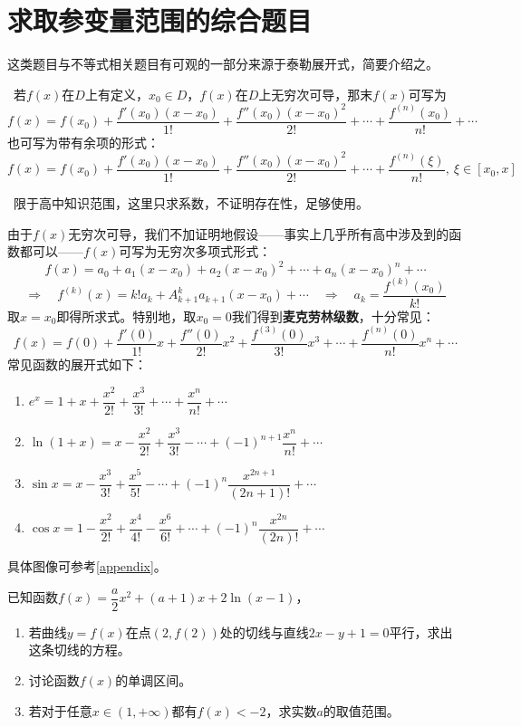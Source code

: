 \section{求取参变量范围的综合题目}
这类题目与不等式相关题目有可观的一部分来源于泰勒展开式，简要介绍之。
\begin{thm}
	\ 若$f(x)$在$D$上有定义，$x_0\in D$，$f(x)$在$D$上无穷次可导，那末$f(x)$可写为
	$$f(x)=f(x_0)+\dfrac{f'(x_0)(x-x_0)}{1!}+\dfrac{f''(x_0)(x-x_0)^2}{2!}+\cdots+\dfrac{f^{(n)}(x_0)}{n!}+\cdots$$也可写为带有余项的形式：$$f(x)=f(x_0)+\dfrac{f'(x_0)(x-x_0)}{1!}+\dfrac{f''(x_0)(x-x_0)^2}{2!}+\cdots+\dfrac{f^{(n)}(\xi)}{n!},\ \xi\in[x_0,x]$$
\end{thm}
\begin{kaiti}
	\ 限于高中知识范围，这里只求系数，不证明存在性，足够使用。\par
	由于$f(x)$无穷次可导，我们不加证明地假设——事实上几乎所有高中涉及到的函数都可以——$f(x)$可写为无穷次多项式形式：$$f(x)=a_0+a_1(x-x_0)+a_2(x-x_0)^2+\cdots+a_n(x-x_0)^n+\cdots$$$$\Rightarrow\quad f^{(k)}(x)=k!a_k+A_{k+1}^ka_{k+1}(x-x_0)+\cdots\quad\Rightarrow\quad a_k=\dfrac{f^{(k)}(x_0)}{k!}$$取$x=x_0$即得所求式。特别地，取$x_0=0$我们得到\textbf{麦克劳林级数}，十分常见：
	$$f(x)=f(0)+\dfrac{f'(0)}{1!}x+\dfrac{f''(0)}{2!}x^2+\dfrac{f^{(3)}(0)}{3!}x^3+\cdots+\dfrac{f^{(n)}(0)}{n!}x^n+\cdots$$
	常见函数的展开式如下：\begin{enumerate}
		\item $\displaystyle e^x=1+x+\dfrac{x^2}{2!}+\dfrac{x^3}{3!}+\cdots+\dfrac{x^n}{n!}+\cdots$
		\item $\displaystyle \ln(1+x)=x-\dfrac{x^2}{2!}+\dfrac{x^3}{3!}-\cdots+(-1)^{n+1}\dfrac{x^{n}}{n!}+\cdots$
		\item $\sin x=x-\dfrac{x^3}{3!}+\dfrac{x^5}{5!}-\cdots+(-1)^{n}\dfrac{x^{2n+1}}{(2n+1)!}+\cdots$
		\item $\cos x=1-\dfrac{x^2}{2!}+\dfrac{x^4}{4!}-\dfrac{x^6}{6!}+\cdots+(-1)^n\dfrac{x^{2n}}{(2n)!}+\cdots$    
	\end{enumerate}
	具体图像可参考\ref{appendix}。
\end{kaiti}\vspace{1em}
\begin{que}
	已知函数$f(x)=\dfrac{a}{2}x^2+(a+1)x+2\ln(x-1)$，
	\begin{enumerate}
		\item 若曲线$y=f(x)$在点$(2,f(2))$处的切线与直线$2x-y+1=0$平行，求出这条切线的方程。
		\item 讨论函数$f(x)$的单调区间。
		\item 若对于任意$x\in(1,+\infty)$都有$f(x)<-2$，求实数$a$的取值范围。
	\end{enumerate}
\end{que}
